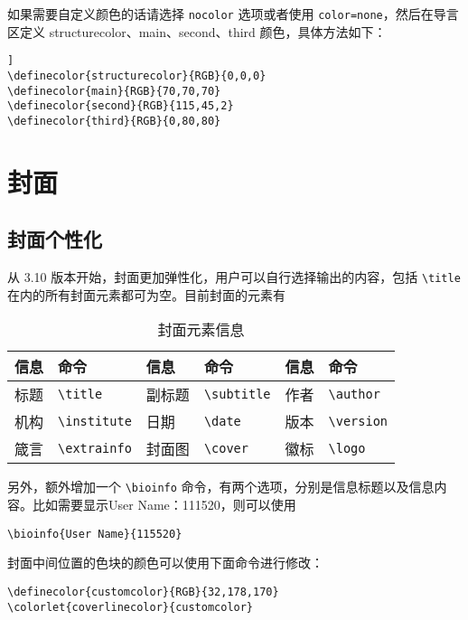 \documentclass[lang=cn,10pt]{elegantbook}
\begin{document}
如果需要自定义颜色的话请选择 \lstinline{nocolor} 选项或者使用 \lstinline{color=none}，然后在导言区定义 structurecolor、main、second、third 颜色，具体方法如下：
\begin{lstlisting}[tabsize=4]]
\definecolor{structurecolor}{RGB}{0,0,0}
\definecolor{main}{RGB}{70,70,70}    
\definecolor{second}{RGB}{115,45,2}    
\definecolor{third}{RGB}{0,80,80}
\end{lstlisting}

\section{封面}

\subsection{封面个性化}

从 3.10 版本开始，封面更加弹性化，用户可以自行选择输出的内容，包括 \lstinline{\title} 在内的所有封面元素都可为空。目前封面的元素有

\begin{table}[htbp]
  \centering
  \caption{封面元素信息}
  \begin{tabular}{p{}p{}|p{}p{}|p{}p{}}
    \toprule
    信息 & 命令 & 信息 & 命令 & 信息 & 命令 \\
    \midrule
    标题 & \lstinline|\title| & 副标题 & \lstinline|\subtitle| & 作者 & \lstinline|\author| \\
    机构 & \lstinline|\institute| & 日期 &  \lstinline|\date| & 版本 & \lstinline|\version| \\
    箴言 & \lstinline|\extrainfo| & 封面图 & \lstinline|\cover| & 徽标 & \lstinline|\logo| \\
    \bottomrule
  \end{tabular}
\end{table}

另外，额外增加一个 \lstinline{\bioinfo} 命令，有两个选项，分别是信息标题以及信息内容。比如需要显示{\kaishu User Name：111520}，则可以使用 
\begin{lstlisting}
\bioinfo{User Name}{115520}
\end{lstlisting}

封面中间位置的色块的颜色可以使用下面命令进行修改：
\begin{lstlisting}
\definecolor{customcolor}{RGB}{32,178,170}
\colorlet{coverlinecolor}{customcolor}
\end{lstlisting}
\end{document}
